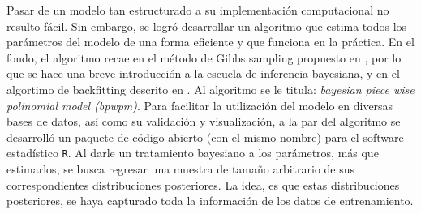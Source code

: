 \documentclass[../Main/Main.tex]{subfiles}
\begin{document}
Pasar de un modelo tan estructurado a su implementación computacional no resulto fácil. Sin embargo, se logró desarrollar un algoritmo que estima todos los parámetros del modelo de una forma eficiente y que funciona en la práctica. En el fondo, el algoritmo recae en el método de Gibbs sampling propuesto en \autocite{albert1993bayesian}, por lo que se hace una breve introducción a la escuela de inferencia bayesiana, y en el algortimo de backfitting descrito en \autocite{hastie1986generalized}. Al algoritmo se le titula: \textit{bayesian piece wise polinomial model (bpwpm)}. Para facilitar la utilización del modelo en diversas bases de datos, así como  su validación y visualización, a la par del algoritmo se desarrolló un paquete de código abierto (con el mismo nombre) para el software estadístico \verb|R|. Al darle un tratamiento bayesiano a los parámetros, más que estimarlos, se busca regresar una muestra de tamaño arbitrario de sus correspondientes distribuciones posteriores. La idea, es que estas distribuciones posteriores, se haya capturado toda la información de los datos de entrenamiento. \\
\end{document}

